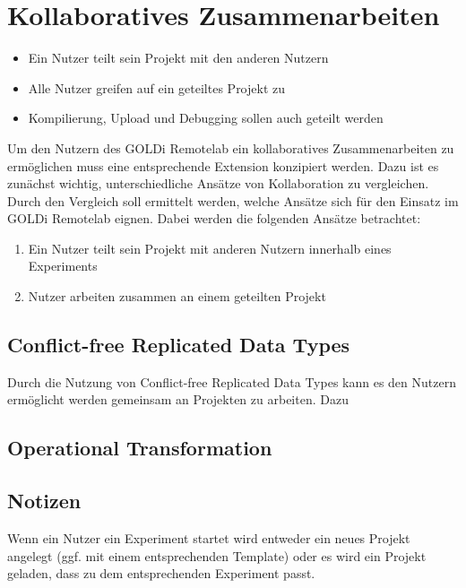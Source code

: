 \section{Kollaboratives Zusammenarbeiten} \label{kollaboration}

\begin{itemize}
    \item Ein Nutzer teilt sein Projekt mit den anderen Nutzern
    \item Alle Nutzer greifen auf ein geteiltes Projekt zu
    \item Kompilierung, Upload und Debugging sollen auch geteilt werden
\end{itemize}

Um den Nutzern des GOLDi Remotelab ein kollaboratives Zusammenarbeiten zu ermöglichen muss eine entsprechende Extension konzipiert werden. Dazu ist es zunächst wichtig, unterschiedliche Ansätze von Kollaboration zu vergleichen. Durch den Vergleich soll ermittelt werden, welche Ansätze sich für den Einsatz im GOLDi Remotelab eignen. Dabei werden die folgenden Ansätze betrachtet:

\begin{enumerate}
    \item Ein Nutzer teilt sein Projekt mit anderen Nutzern innerhalb eines Experiments
    \item Nutzer arbeiten zusammen an einem geteilten Projekt
\end{enumerate}

\subsection{Conflict-free Replicated Data Types}

Durch die Nutzung von Conflict-free Replicated Data Types kann es den Nutzern ermöglicht werden gemeinsam an Projekten zu arbeiten. Dazu

\subsection{Operational Transformation}

\subsection{Notizen}

Wenn ein Nutzer ein Experiment startet wird entweder ein neues Projekt angelegt (ggf. mit einem entsprechenden Template) oder es wird ein Projekt geladen, dass zu dem entsprechenden Experiment passt.